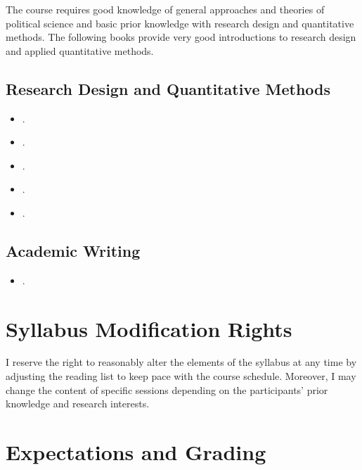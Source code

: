 \documentclass[abstract=on,parskip=full,headings=standardclasses,fontsize=11pt,paper=a4]{scrartcl}
\begin{document}
The course requires good knowledge of general approaches and theories of political science and basic prior knowledge with research design and quantitative methods. The following books provide very good introductions to research design and applied quantitative methods.

\subsection*{Research Design and Quantitative Methods}
\begin{itemize}
\item {}.
\item {}.
\item {}.
\item {}.
\item {}.
\end{itemize}

\subsection*{Academic Writing}
\begin{itemize}
\item {}.
\end{itemize}


\section*{Syllabus Modification Rights}

I reserve the right to reasonably alter the elements of the syllabus at any time by adjusting the reading list to keep pace with the course schedule. Moreover, I may change the content of specific sessions depending on the participants' prior knowledge and research interests.


\section*{Expectations and Grading}
\end{document}
